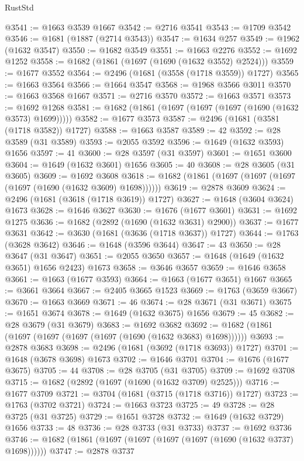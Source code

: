 \begin{lexlean}{RustStd}
\begin{coremodule}
{\begin{coremodule}
{{{{{{{{{{{{{{{{{{{{{{{{{{{{{{{{{{{{{{{{{{{{@3541 := @1663 @3539 @1667
@3542 := @2716 @3541
@3543 := @1709 @3542
@3546 := @1681 (@1887 (@2714 @3543))
@3547 := @1634 @257
@3549 := @1962 (@1632 @3547)
@3550 := @1682 @3549
@3551 := @1663 @2276
@3552 := @1692 @1252
@3558 := @1682 (@1861 (@1697 (@1690 (@1632 @3552) @2524)))
@3559 := @1677 @3552
@3564 := @2496 (@1681 (@3558 (@1718 @3559)) @1727)
@3565 := @1663 @3564
@3566 := @1664 @3547
@3568 := @1968 @3566 @3011
@3570 := @1663 @3568 @1667
@3571 := @2716 @3570
@3572 := @1663 @3571
@3573 := @1692 @1268
@3581 := @1682 (@1861 (@1697 (@1697 (@1697 (@1690 (@1632 @3573) @1699)))))
@3582 := @1677 @3573
@3587 := @2496 (@1681 (@3581 (@1718 @3582)) @1727)
@3588 := @1663 @3587
@3589 := 42
@3592 := @28 @3589 (@31 @3589)
@3593 := @2055 @3592
@3596 := @1649 (@1632 @3593) @1656
@3597 := 41
@3600 := @28 @3597 (@31 @3597)
@3601 := @1651 @3600
@3604 := @1649 (@1632 @3601) @1656
@3605 := 40
@3608 := @28 @3605 (@31 @3605)
@3609 := @1692 @3608
@3618 := @1682 (@1861 (@1697 (@1697 (@1697 (@1697 (@1690 (@1632 @3609) @1698))))))
@3619 := @2878 @3609
@3624 := @2496 (@1681 (@3618 (@1718 @3619)) @1727)
@3627 := @1648 (@3604 @3624) @1673
@3628 := @1646 @3627
@3630 := @1676 (@1677 @3601)
@3631 := @1692 @1275
@3636 := @1682 (@2892 (@1690 (@1632 @3631) @2900))
@3637 := @1677 @3631
@3642 := @3630 (@1681 (@3636 (@1718 @3637)) @1727)
@3644 := @1763 (@3628 @3642)
@3646 := @1648 (@3596 @3644)
@3647 := 43
@3650 := @28 @3647 (@31 @3647)
@3651 := @2055 @3650
@3657 := @1648 (@1649 (@1632 @3651) @1656 @2423) @1673
@3658 := @3646 @3657
@3659 := @1646 @3658
@3661 := @1663 (@1677 @3593)
@3664 := @1663 (@1677 @3651) @1667
@3665 := @3661 @3664
@3667 := @2405 @3665 @1523
@3669 := @1763 (@3659 @3667)
@3670 := @1663 @3669
@3671 := 46
@3674 := @28 @3671 (@31 @3671)
@3675 := @1651 @3674
@3678 := @1649 (@1632 @3675) @1656
@3679 := 45
@3682 := @28 @3679 (@31 @3679)
@3683 := @1692 @3682
@3692 := @1682 (@1861 (@1697 (@1697 (@1697 (@1697 (@1690 (@1632 @3683) @1698))))))
@3693 := @2878 @3683
@3698 := @2496 (@1681 (@3692 (@1718 @3693)) @1727)
@3701 := @1648 (@3678 @3698) @1673
@3702 := @1646 @3701
@3704 := @1676 (@1677 @3675)
@3705 := 44
@3708 := @28 @3705 (@31 @3705)
@3709 := @1692 @3708
@3715 := @1682 (@2892 (@1697 (@1690 (@1632 @3709) @2525)))
@3716 := @1677 @3709
@3721 := @3704 (@1681 (@3715 (@1718 @3716)) @1727)
@3723 := @1763 (@3702 @3721)
@3724 := @1663 @3723
@3725 := 49
@3728 := @28 @3725 (@31 @3725)
@3729 := @1651 @3728
@3732 := @1649 (@1632 @3729) @1656
@3733 := 48
@3736 := @28 @3733 (@31 @3733)
@3737 := @1692 @3736
@3746 := @1682 (@1861 (@1697 (@1697 (@1697 (@1697 (@1690 (@1632 @3737) @1698))))))
@3747 := @2878 @3737
}}}}}}}}}}}}}}}}}}}}}}}}}}}}}}}}}}}}}}}}}}}}
\end{coremodule}}
\end{coremodule}
\end{lexlean}
